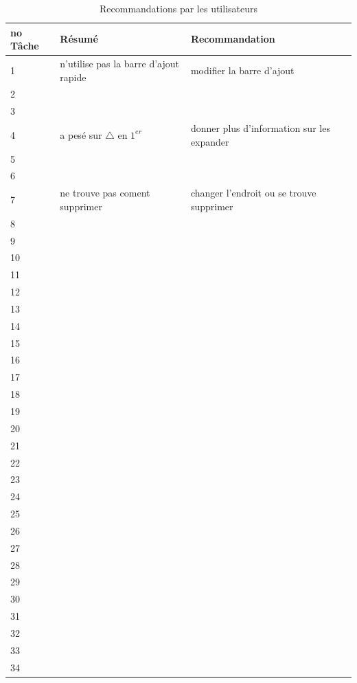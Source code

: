 \documentclass[letterpaper, oneside, 12pt, these, creativecommons]{thETS}
\begin{document}
\newpage

\begin{table}
	\centering
	\begin{tabular}{|l|l|l|}
	\hline
	no Tâche	& Résumé	& Recommandation 	\\ \hline \hline
	1		&  n'utilise pas la barre d'ajout rapide		&  modifier la barre d'ajout \\ \hline
	2		& 							&  									\\ \hline
	3		& 							&  									\\ \hline
	4		& a pesé sur $\bigtriangleup$ en $1^{er}$	& donner plus d'information sur les expander \\ \hline
	5		& 							&  									\\ \hline
	6		& 							&  									\\ \hline
	7		& ne trouve pas coment supprimer		&  changer l'endroit ou se trouve supprimer			\\ \hline
	8		& 							&  									\\ \hline
	9		& 							&  									\\ \hline
	10		& 							&  									\\ \hline
	11		& 							&  									\\ \hline
	12		& 							&  									\\ \hline
	13		& 							&  									\\ \hline
	14		& 							&  									\\ \hline
	15		& 							&  									\\ \hline
	16		&							&  									\\ \hline
	17		& 							&  									\\ \hline
	18		& 							&  									\\ \hline
	19		& 							&  									\\ \hline
	20		& 							&  									\\ \hline
	21		& 							&  									\\ \hline
	22		& 							&  									\\ \hline
	23		& 							&  									\\ \hline
	24		& 							&  									\\ \hline
	25		& 							&  									\\ \hline
	26		& 							&  									\\ \hline
	27		& 							&  									\\ \hline
	28		& 							&  									\\ \hline
	29		& 							&  									\\ \hline
	30		& 							&  									\\ \hline
	31		& 							&  									\\ \hline
	32		& 							&  									\\ \hline
	33		& 							&  									\\ \hline
	34		& 							&  									\\ \hline
	\end{tabular}
	\caption{Recommandations par les utilisateurs}
\end{table}
\end{document}
